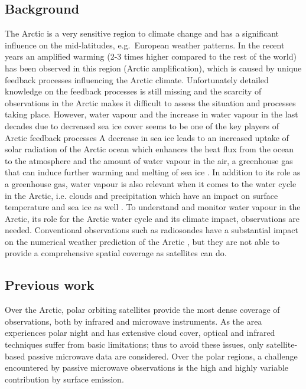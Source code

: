 \documentclass[12pt,oneside,a4paper]{article}
\begin{document}
\subsection{Background}
%
\label{sec:background}
The Arctic is a very sensitive region to climate change and has a significant
influence on the mid-latitudes, e.g.\ European weather patterns. In the recent
years an amplified warming (2-3 times higher compared to the rest of the world)
has been observed in this region (Arctic amplification), which is caused by
unique feedback processes influencing the Arctic climate. Unfortunately
detailed knowledge on the feedback processes is still missing and the scarcity
of observations in the Arctic makes it difficult to assess the situation and
processes taking place. However, water vapour and the increase in water vapour
in the last decades due to decreased sea ice cover seems to be one of the key
players of Arctic feedback processes \citep{serreze:2012:recen,
  vihma:2016:theat} A decrease in sea ice leads to an increased uptake of solar
radiation of the Arctic ocean which enhances the heat flux from the ocean to
the atmosphere and the amount of water vapour in the air, a greenhouse gas that
can induce further warming and melting of sea ice \citep{screen:2010:thece}. In
addition to its role as a greenhouse gas, water vapour is also relevant when it
comes to the water cycle in the Arctic, i.e. clouds and precipitation which
have an impact on surface temperature and sea ice as well
\citep{blanchet:water:1995}. To understand and monitor water vapour in the
Arctic, its role for the Arctic water cycle and its climate impact,  observations
are needed. Conventional observations such as radiosondes have a substantial
impact on the numerical weather prediction of the Arctic
\citep{lawrence:2019:usean}, but they are not able to provide a comprehensive
spatial coverage as satellites can do.

\subsection{Previous work}
%
\label{sec:previousworks}
%
Over the Arctic, polar orbiting satellites provide the most dense coverage
of observations, both by infrared and microwave instruments. As the area
experiences polar night and has extensive cloud cover, optical and infrared
techniques suffer from basic limitations; thus to avoid these issues, only
satellite-based passive microwave data are considered. Over the polar regions, a
challenge encountered by passive microwave observations is the high and highly
variable contribution by surface emission.
\end{document}
